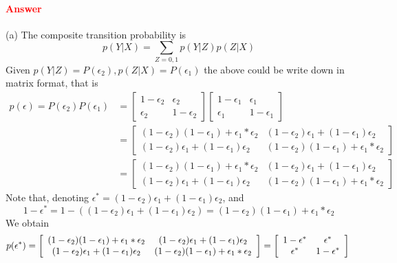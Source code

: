 \documentclass[8pt]{article}
\begin{document}
\paragraph{\textcolor{red}{Answer}}
(a) The composite transition probability is
$$
p(Y|X)=\sum_{Z=0,1} p(Y|Z) p(Z|X)
$$
Given $p(Y|Z) = P(\epsilon_2), p(Z|X)=P(\epsilon_1)$
the above could be write down in matrix format, that is 
$$
\begin{aligned}
p(\epsilon) = P(\epsilon_2) P(\epsilon_1) &= 
\left[\begin{array}{cc}
1-\epsilon_2 & \epsilon_2 \\
\epsilon_2 & 1-\epsilon_2
\end{array}\right] 
\left[\begin{array}{cc}
1-\epsilon_1 & \epsilon_1 \\
\epsilon_1 & 1-\epsilon_1
\end{array}\right] \\
&= 
\left[\begin{array}{cc}
(1-\epsilon_2)(1-\epsilon_1)+\epsilon_1*\epsilon_2  & (1-\epsilon_2)\epsilon_1 + (1-\epsilon_1)\epsilon_2 \\
(1-\epsilon_2)\epsilon_1 + (1-\epsilon_1)\epsilon_2& (1-\epsilon_2)(1-\epsilon_1)+\epsilon_1*\epsilon_2
\end{array}\right] \\
&= 
\left[\begin{array}{cc}
(1-\epsilon_2)(1-\epsilon_1)+\epsilon_1*\epsilon_2  & (1-\epsilon_2)\epsilon_1 + (1-\epsilon_1)\epsilon_2 \\
(1-\epsilon_2)\epsilon_1 + (1-\epsilon_1)\epsilon_2& (1-\epsilon_2)(1-\epsilon_1)+\epsilon_1*\epsilon_2
\end{array}\right]
\end{aligned}
$$
Note that, denoting $\epsilon^{*} = (1-\epsilon_2)\epsilon_1 + (1-\epsilon_1)\epsilon_2$, and
$$
1- \epsilon^{*} = 
1 - ((1-\epsilon_2)\epsilon_1 + (1-\epsilon_1)\epsilon_2) = (1-\epsilon_2)(1-\epsilon_1)+\epsilon_1*\epsilon_2
$$
We obtain 
$$
p(\epsilon^{*}) = \left[\begin{array}{cc}
(1-\epsilon_2)(1-\epsilon_1)+\epsilon_1*\epsilon_2  & (1-\epsilon_2)\epsilon_1 + (1-\epsilon_1)\epsilon_2 \\
(1-\epsilon_2)\epsilon_1 + (1-\epsilon_1)\epsilon_2& (1-\epsilon_2)(1-\epsilon_1)+\epsilon_1*\epsilon_2
\end{array}\right] = 
\left[\begin{array}{cc}
1-\epsilon^{*} & \epsilon^{*} \\
\epsilon^{*} & 1-\epsilon^{*}
\end{array}\right] \\
$$
\end{document}
